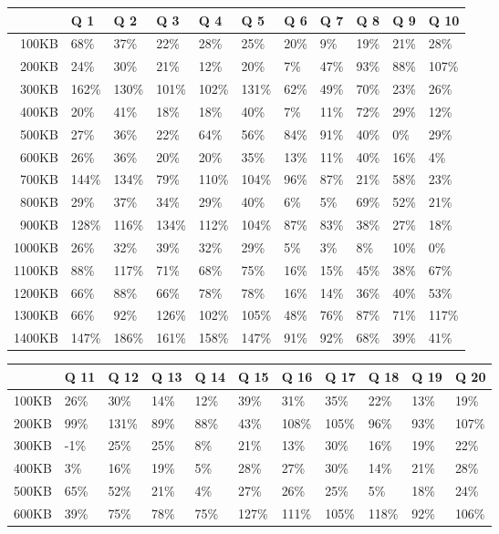 
\begin {table}[htpb]
\centering
\begin{tabular}{r|l|l|l|l|l|l|l|l|l|l}
&Q 1&Q 2&Q 3&Q 4&Q 5&Q 6&Q 7&Q 8&Q 9&Q 10\\
\hline
100KB&68\%&37\%&22\%&28\%&25\%&20\%&9\%&19\%&21\%&28\%\\
200KB&24\%&30\%&21\%&12\%&20\%&7\%&47\%&93\%&88\%&107\%\\
300KB&162\%&130\%&101\%&102\%&131\%&62\%&49\%&70\%&23\%&26\%\\
400KB&20\%&41\%&18\%&18\%&40\%&7\%&11\%&72\%&29\%&12\%\\
500KB&27\%&36\%&22\%&64\%&56\%&84\%&91\%&40\%&0\%&29\%\\
600KB&26\%&36\%&20\%&20\%&35\%&13\%&11\%&40\%&16\%&4\%\\
700KB&144\%&134\%&79\%&110\%&104\%&96\%&87\%&21\%&58\%&23\%\\
800KB&29\%&37\%&34\%&29\%&40\%&6\%&5\%&69\%&52\%&21\%\\
900KB&128\%&116\%&134\%&112\%&104\%&87\%&83\%&38\%&27\%&18\%\\
1000KB&26\%&32\%&39\%&32\%&29\%&5\%&3\%&8\%&10\%&0\%\\
1100KB&88\%&117\%&71\%&68\%&75\%&16\%&15\%&45\%&38\%&67\%\\
1200KB&66\%&88\%&66\%&78\%&78\%&16\%&14\%&36\%&40\%&53\%\\
1300KB&66\%&92\%&126\%&102\%&105\%&48\%&76\%&87\%&71\%&117\%\\
1400KB&147\%&186\%&161\%&158\%&147\%&91\%&92\%&68\%&39\%&41\%\\
\end{tabular}
\newline
\vspace*{0.5 cm}
\newline
\begin{tabular}{r|l|l|l|l|l|l|l|l|l|l}
&Q 11&Q 12&Q 13&Q 14&Q 15&Q 16&Q 17&Q 18&Q 19&Q 20\\
\hline
100KB&26\%&30\%&14\%&12\%&39\%&31\%&35\%&22\%&13\%&19\%\\
200KB&99\%&131\%&89\%&88\%&43\%&108\%&105\%&96\%&93\%&107\%\\
300KB&-1\%&25\%&25\%&8\%&21\%&13\%&30\%&16\%&19\%&22\%\\
400KB&3\%&16\%&19\%&5\%&28\%&27\%&30\%&14\%&21\%&28\%\\
500KB&65\%&52\%&21\%&4\%&27\%&26\%&25\%&5\%&18\%&24\%\\
600KB&39\%&75\%&78\%&75\%&127\%&111\%&105\%&118\%&92\%&106\%\\

\end{tabular}
\end{table}
